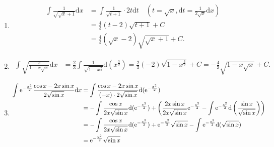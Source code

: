 \begin{solution}
\begin{enumerate}
        \item \begin{align*}
                  \int \frac{1}{\sqrt{\sqrt{x} + 1}} \mathrm{d}x & = \int \frac{1}{\sqrt{t + 1}} \cdot 2t \mathrm{d}t \quad (t = \sqrt{x}, \mathrm{d}t = \frac{1}{2\sqrt{x}} \mathrm{d}x) \\
                                                                 & = \frac{4}{3} (t-2) \sqrt{t + 1} + C                                                                                   \\
                                                                 & = \frac{4}{3} (\sqrt{x} - 2) \sqrt{\sqrt{x} + 1} + C.
              \end{align*}

        \item \begin{align*}
                  \int \sqrt{\frac{x}{1 - x \sqrt{x}}} \mathrm{d}x & = \frac{2}{3} \int \frac{1}{\sqrt{1 - x^{\frac{3}{2}}}} \mathrm{d}(x^{\frac{3}{2}})  = \frac{2}{3} (-2) \sqrt{1 - x^{\frac{3}{2}}} + C  = -\frac{4}{3} \sqrt{1 - x \sqrt{x}} + C.
              \end{align*}

        \item \begin{align*}
                  \int \mathrm{e}^{-\frac{x^2}{2}} \frac{\cos x - 2x \sin x}{2 \sqrt{\sin x}} \mathrm{d}x & = \int \frac{\cos x - 2x \sin x}{(-x) \cdot 2 \sqrt{\sin x}} \mathrm{d}(\mathrm{e}^{-\frac{x^2}{2}})                                                                                                                                                          \\
                                                                                                          & =- \int \frac{\cos x}{2 x \sqrt{\sin x}} \mathrm{d}(\mathrm{e}^{-\frac{x^2}{2}}) +\left(  \frac{2x \sin x}{2 x \sqrt{\sin x}} \mathrm{e}^{\mathrm{-\frac{x^2}{2}}} - \int \mathrm{e}^{\mathrm{-\frac{x^2}{2}}} \mathrm{d}\left( \frac{ \sin x}{\sqrt{\sin x}} \right) \right) \\
                                                                                                          & = - \int \frac{\cos x}{2 x \sqrt{\sin x}} \mathrm{d}(\mathrm{e}^{-\frac{x^2}{2}}) + \mathrm{e}^{\mathrm{-\frac{x^2}{2}}} \sqrt{\sin x} - \int \mathrm{e}^{\mathrm{-\frac{x^2}{2}}} \mathrm{d}(\sqrt{\sin x})                                                                  \\
                                                                                                          & = \mathrm{e}^{\mathrm{-\frac{x^2}{2}}} \sqrt{\sin x}
              \end{align*}


\end{enumerate}
\end{solution}
